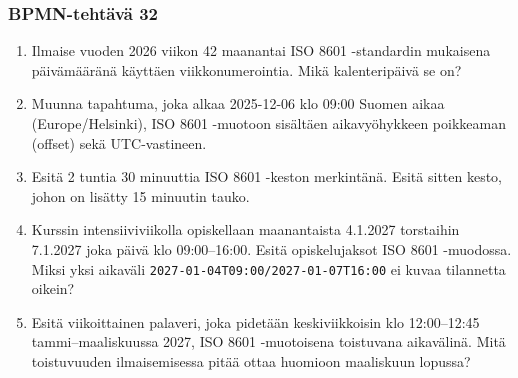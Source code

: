 \documentclass[
  finnish,
  letterpaper,
  DIV=11,
  numbers=noendperiod,
  oneside]{scrreprt}
\providecommand{\tightlist}{%
  \setlength{\itemsep}{0pt}\setlength{\parskip}{0pt}}
\begin{document}
\subsubsection{BPMN-tehtävä 32}\label{bpmn-tehtuxe4vuxe4-32}

\begin{enumerate}
\def\labelenumi{\arabic{enumi}.}
\tightlist
\item
  Ilmaise vuoden 2026 viikon 42 maanantai ISO 8601 -standardin mukaisena
  päivämääränä käyttäen viikkonumerointia. Mikä kalenteripäivä se on?
\item
  Muunna tapahtuma, joka alkaa 2025-12-06 klo 09:00 Suomen aikaa
  (Europe/Helsinki), ISO 8601 -muotoon sisältäen aikavyöhykkeen
  poikkeaman (offset) sekä UTC-vastineen.
\item
  Esitä 2 tuntia 30 minuuttia ISO 8601 -keston merkintänä. Esitä sitten
  kesto, johon on lisätty 15 minuutin tauko.
\item
  Kurssin intensiiviviikolla opiskellaan maanantaista 4.1.2027
  torstaihin 7.1.2027 joka päivä klo 09:00--16:00. Esitä opiskelujaksot
  ISO 8601 -muodossa. Miksi yksi aikaväli
  \texttt{2027-01-04T09:00/2027-01-07T16:00} ei kuvaa tilannetta oikein?
\item
  Esitä viikoittainen palaveri, joka pidetään keskiviikkoisin klo
  12:00--12:45 tammi--maaliskuussa 2027, ISO 8601 -muotoisena toistuvana
  aikavälinä. Mitä toistuvuuden ilmaisemisessa pitää ottaa huomioon
  maaliskuun lopussa?
\end{enumerate}
\end{document}
